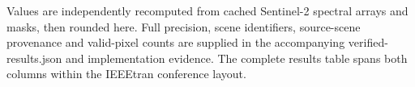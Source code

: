\documentclass[conference]{IEEEtran}
\begin{document}
\noindent\footnotesize Values are independently recomputed from cached Sentinel-2 spectral arrays and masks, then rounded here. Full precision, scene identifiers, source-scene provenance and valid-pixel counts are supplied in the accompanying verified-results.json and implementation evidence. The complete results table spans both columns within the IEEEtran conference layout.
\end{document}
